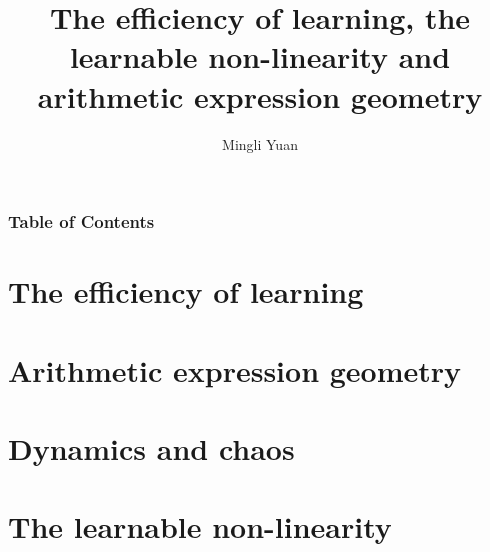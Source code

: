 \documentclass{beamer}
\title{The efficiency of learning, \newline the learnable non-linearity \newline and arithmetic expression geometry}
\author[Author] {Mingli Yuan}
\begin{document}
\begin{frame}
\maketitle
\end{frame}

\begin{frame}
\frametitle{Table of Contents}
\tableofcontents
\end{frame}

\section{The efficiency of learning}

\section{Arithmetic expression geometry}

\section{Dynamics and chaos}

\section{The learnable non-linearity}
\end{document}
